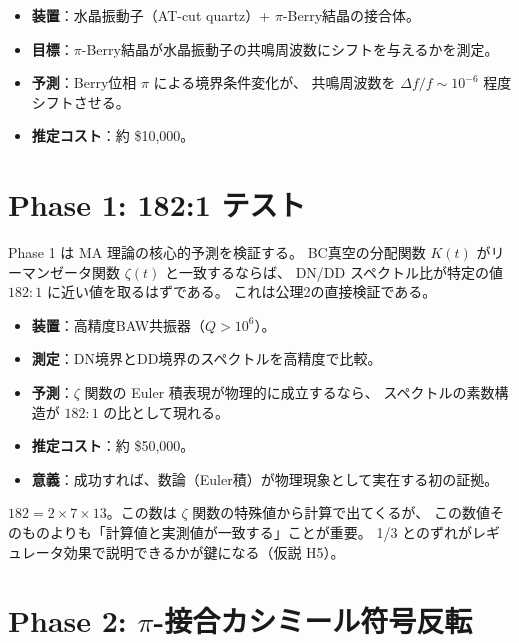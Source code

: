 \begin{itemize}
  \item \textbf{装置}：水晶振動子（AT-cut quartz）+ $\pi$-Berry結晶の接合体。
  \item \textbf{目標}：$\pi$-Berry結晶が水晶振動子の共鳴周波数にシフトを与えるかを測定。
  \item \textbf{予測}：Berry位相 $\pi$ による境界条件変化が、
        共鳴周波数を $\Delta f / f \sim 10^{-6}$ 程度シフトさせる。
  \item \textbf{推定コスト}：約 \$10,000。
\end{itemize}

\section{Phase 1: 182:1 テスト}
\label{sec:15.3}

\begin{keyresult}[$K = \zeta$ の実験検証]
Phase 1 は MA 理論の核心的予測を検証する。
BC真空の分配関数 $K(t)$ がリーマンゼータ関数 $\zeta(t)$ と一致するならば、
DN/DD スペクトル比が特定の値 $182:1$ に近い値を取るはずである。
これは公理2の直接検証である。
\end{keyresult}

\begin{itemize}
  \item \textbf{装置}：高精度BAW共振器（$Q > 10^6$）。
  \item \textbf{測定}：DN境界とDD境界のスペクトルを高精度で比較。
  \item \textbf{予測}：$\zeta$ 関数の Euler 積表現が物理的に成立するなら、
        スペクトルの素数構造が $182:1$ の比として現れる。
  \item \textbf{推定コスト}：約 \$50,000。
  \item \textbf{意義}：成功すれば、数論（Euler積）が物理現象として実在する初の証拠。
\end{itemize}

\begin{hsbox}
$182 = 2 \times 7 \times 13$。この数は $\zeta$ 関数の特殊値から計算で出てくるが、
この数値そのものよりも「計算値と実測値が一致する」ことが重要。
1/3 とのずれがレギュレータ効果で説明できるかが鍵になる（仮説 H5）。
\end{hsbox}

\section{Phase 2: $\pi$-接合カシミール符号反転}
\label{sec:15.4}

